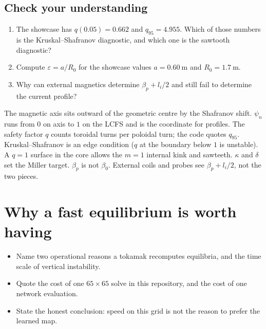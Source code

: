\documentclass[11pt,a4paper,oneside,openany]{book}
\numberwithin{equation}{chapter}
\newcommand{\psin}{\psi_{n}}
\theoremstyle{definition}
\begin{document}
\section*{Check your understanding}
\begin{enumerate}[label=\textbf{Q6.\arabic*.},leftmargin=2.4em]
\item The showcase has \(q(0.05)=0.662\) and \(q_{95}=4.955\). Which of those numbers is the Kruskal--Shafranov diagnostic, and which one is the sawtooth diagnostic?
\item Compute \(\varepsilon=a/R_{0}\) for the showcase values \(a=\qty{0.60}{\metre}\) and \(R_{0}=\qty{1.7}{\metre}\).
\item Why can external magnetics determine \(\beta_{p}+l_{i}/2\) and still fail to determine the current profile?
\end{enumerate}

\begin{keyideas}
The magnetic axis sits outward of the geometric centre by the Shafranov shift. \(\psin\) runs from \(0\) on axis to \(1\) on the LCFS and is the coordinate for profiles. The safety factor \(q\) counts toroidal turns per poloidal turn; the code quotes \(q_{95}\). Kruskal--Shafranov is an edge condition (\(q\) at the boundary below \(1\) is unstable). A \(q=1\) surface in the core allows the \(m=1\) internal kink and sawteeth. \(\kappa\) and \(\delta\) set the Miller target. \(\beta_{p}\) is not \(\beta_{0}\). External coils and probes see \(\beta_{p}+l_{i}/2\), not the two pieces.
\end{keyideas}

\chapter{Why a fast equilibrium is worth having}
\label{ch:speed}

\begin{objectives}
\begin{itemize}[leftmargin=1.2em]
\item Name two operational reasons a tokamak recomputes equilibria, and the time scale of vertical instability.
\item Quote the cost of one \(65\times 65\) solve in this repository, and the cost of one network evaluation.
\item State the honest conclusion: speed on this grid is not the reason to prefer the learned map.
\end{itemize}
\end{objectives}
\end{document}
